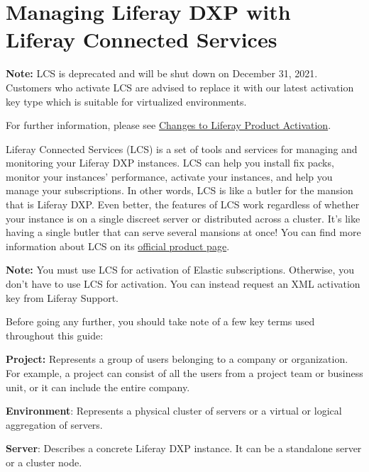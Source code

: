 \chapter{Managing Liferay DXP with Liferay Connected
Services}\label{managing-liferay-dxp-with-liferay-connected-services}

\noindent\hrulefill

\textbf{Note:} LCS is deprecated and will be shut down on December 31,
2021. Customers who activate LCS are advised to replace it with our
latest activation key type which is suitable for virtualized
environments.

For further information, please see
\href{https://help.liferay.com/hc/en-us/articles/4402347960845-Changes-to-Liferay-Product-Activation}{Changes
to Liferay Product Activation}.

\noindent\hrulefill

Liferay Connected Services (LCS) is a set of tools and services for
managing and monitoring your Liferay DXP instances. LCS can help you
install fix packs, monitor your instances' performance, activate your
instances, and help you manage your subscriptions. In other words, LCS
is like a butler for the mansion that is Liferay DXP. Even better, the
features of LCS work regardless of whether your instance is on a single
discreet server or distributed across a cluster. It's like having a
single butler that can serve several mansions at once! You can find more
information about LCS on its
\href{http://www.liferay.com/products/liferay-connected-services}{official
product page}.

\noindent\hrulefill

\textbf{Note:} You must use LCS for activation of Elastic subscriptions.
Otherwise, you don't have to use LCS for activation. You can instead
request an XML activation key from Liferay Support.

\noindent\hrulefill

Before going any further, you should take note of a few key terms used
throughout this guide:

\textbf{Project:} Represents a group of users belonging to a company or
organization. For example, a project can consist of all the users from a
project team or business unit, or it can include the entire company.

\textbf{Environment}: Represents a physical cluster of servers or a
virtual or logical aggregation of servers.

\textbf{Server}: Describes a concrete Liferay DXP instance. It can be a
standalone server or a cluster node.


